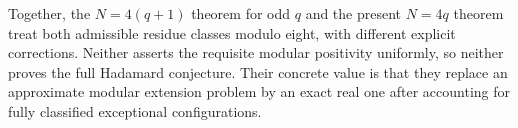 Together, the $N=4(q+1)$ theorem for odd $q$ and the present
$N=4q$ theorem treat both admissible residue classes modulo eight,
with different explicit corrections. Neither asserts the requisite
modular positivity uniformly, so neither proves the full Hadamard
conjecture. Their concrete value is that they replace an approximate
modular extension problem by an exact real one after accounting for
fully classified exceptional configurations.
